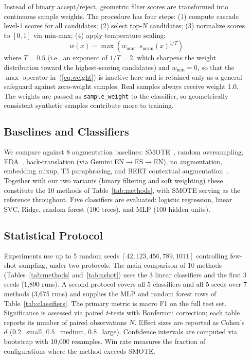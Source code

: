 \documentclass[conference]{IEEEtran}
\begin{document}
Instead of binary accept/reject, geometric filter scores are transformed into continuous sample weights. The procedure has four steps: (1) compute cascade level-1 scores for all candidates; (2) select top-$N$ candidates; (3) normalize scores to $[0,1]$ via min-max; (4) apply temperature scaling:
\begin{equation}
w(x) = \max\left(w_{\min},\ s_{\text{norm}}(x)^{1/T}\right)
\label{eq:weight}
\end{equation}
where $T=0.5$ (i.e., an exponent of $1/T=2$, which sharpens the weight
distribution toward the highest-scoring candidates) and $w_{\min}=0$, so that the $\max$ operator in~(\ref{eq:weight}) is inactive here and is
retained only as a general safeguard against zero-weight samples. Real samples always receive weight 1.0. The weights are passed as \texttt{sample\_weight} to the classifier, so geometrically consistent synthetic samples contribute more to training.

\subsection{Baselines and Classifiers}

We compare against 8 augmentation baselines: SMOTE~\cite{chawla2002smote}, random oversampling, EDA~\cite{wei2019eda}, back-translation (via Gemini EN$\to$ES$\to$EN), no augmentation, embedding mixup, T5 paraphrasing, and BERT contextual augmentation~\cite{devlin2018bert}. Together with our two variants (binary filtering and soft weighting) these constitute the 10 methods of Table~\ref{tab:methods}, with SMOTE serving as the reference throughout. Five classifiers are evaluated: logistic regression, linear SVC, Ridge, random forest (100 trees), and MLP (100 hidden units).

\subsection{Statistical Protocol}

Experiments use up to 5 random seeds $[42, 123, 456, 789, 1011]$ controlling few-shot sampling, under two protocols. The main comparison of 10 methods (Tables~\ref{tab:methods} and~\ref{tab:nshot}) uses the 3 linear classifiers and the first 3 seeds (1,890 runs). A second protocol covers all 5 classifiers and all 5 seeds over 7 methods (3,675 runs) and supplies the MLP and random forest rows of Table~\ref{tab:classifiers}. The primary metric is macro F1 on the full test set. Significance is assessed via paired $t$-tests with Bonferroni correction; each table reports its number of paired observations $N$. Effect sizes are reported as Cohen's $d$ ($0.2$=small, $0.5$=medium, $0.8$=large). Confidence intervals are computed via bootstrap with 10,000 resamples. Win rate measures the fraction of configurations where the method exceeds SMOTE.
\end{document}
